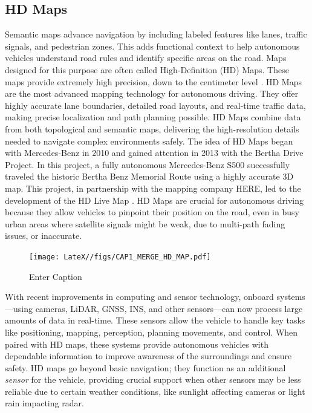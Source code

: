 \subsection{HD Maps}
Semantic maps advance navigation by including labeled features like lanes, traffic signals, and pedestrian zones. This adds functional context to help autonomous vehicles understand road rules and identify specific areas on the road. Maps designed for this purpose are often called High-Definition (HD) Maps. These maps provide extremely high precision, down to the centimeter level \cite{geospatialworld_hd_maps}.
HD Maps are the most advanced mapping technology for autonomous driving. They offer highly accurate lane boundaries, detailed road layouts, and real-time traffic data, making precise localization and path planning possible. HD Maps combine data from both topological and semantic maps, delivering the high-resolution details needed to navigate complex environments safely.
The idea of HD Maps began with Mercedes-Benz in 2010 and gained attention in 2013 with the Bertha Drive Project. In this project, a fully autonomous Mercedes-Benz S500 successfully traveled the historic Bertha Benz Memorial Route using a highly accurate 3D map. This project, in partnership with the mapping company HERE, led to the development of the HD Live Map \cite{8105770}.
HD Maps are crucial for autonomous driving because they allow vehicles to pinpoint their position on the road, even in busy urban areas where satellite signals might be weak, due to multi-path fading issues, or inaccurate.
\begin{figure}[H]
    \centering
    \texttt{[image: LateX//figs/CAP1\_MERGE\_HD\_MAP.pdf]}
    \caption{Enter Caption}
    \label{fig:enter-label}
\end{figure}

With recent improvements in computing and sensor technology, onboard systems—using cameras, LiDAR, GNSS, INS, and other sensors—can now process large amounts of data in real-time. These sensors allow the vehicle to handle key tasks like positioning, mapping, perception, planning movements, and control. When paired with HD maps, these systems provide autonomous vehicles with dependable information to improve awareness of the surroundings and ensure safety.
HD maps go beyond basic navigation; they function as an additional \textit{sensor} for the vehicle, providing crucial support when other sensors may be less reliable due to certain weather conditions, like sunlight affecting cameras or light rain impacting radar\cite{edmap_2004}.

